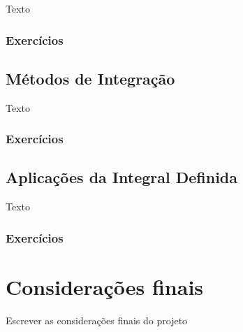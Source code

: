 \documentclass[12 pt, openright, twoside, a4paper, english, french, spanish, brazil]{abntex2}
\begin{document}
Texto

\subsection{Exercícios}

\section{Métodos de Integração}

Texto

\subsection{Exercícios}

\section{Aplicações da Integral Definida}

Texto

\subsection{Exercícios}



\chapter*[Considerações finais]{Considerações finais}

Escrever as considerações finais do projeto


\end{document}
